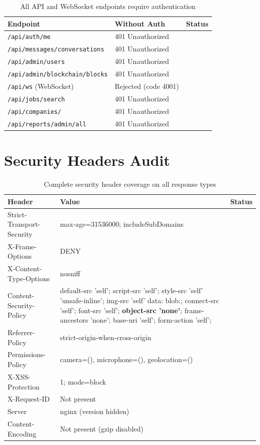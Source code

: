 \documentclass[12pt,a4paper]{article}
\newcommand{\pass}{\textcolor{success}{\checkmark}}
\begin{document}
\begin{table}[H]
\centering
\begin{tabular}{llc}
\toprule
\textbf{Endpoint} & \textbf{Without Auth} & \textbf{Status} \\
\midrule
\texttt{/api/auth/me} & 401 Unauthorized & \pass \\
\texttt{/api/messages/conversations} & 401 Unauthorized & \pass \\
\texttt{/api/admin/users} & 401 Unauthorized & \pass \\
\texttt{/api/admin/blockchain/blocks} & 401 Unauthorized & \pass \\
\texttt{/api/ws} (WebSocket) & Rejected (code 4001) & \pass \\
\texttt{/api/jobs/search} & 401 Unauthorized & \pass \\
\texttt{/api/companies/} & 401 Unauthorized & \pass \\
\texttt{/api/reports/admin/all} & 401 Unauthorized & \pass \\
\bottomrule
\end{tabular}
\caption{All API and WebSocket endpoints require authentication}
\end{table}

\section{Security Headers Audit}

\begin{table}[H]
\centering
\begin{tabularx}{\textwidth}{lXc}
\toprule
\textbf{Header} & \textbf{Value} & \textbf{Status} \\
\midrule
Strict-Transport-Security & max-age=31536000; includeSubDomains & \pass \\
X-Frame-Options & DENY & \pass \\
X-Content-Type-Options & nosniff & \pass \\
Content-Security-Policy & default-src 'self'; script-src 'self'; style-src 'self' 'unsafe-inline'; img-src 'self' data: blob:; connect-src 'self'; font-src 'self'; \textbf{object-src 'none'}; frame-ancestors 'none'; base-uri 'self'; form-action 'self'; & \pass \\
Referrer-Policy & strict-origin-when-cross-origin & \pass \\
Permissions-Policy & camera=(), microphone=(), geolocation=() & \pass \\
X-XSS-Protection & 1; mode=block & \pass \\
X-Request-ID & Not present & \pass \\
Server & nginx (version hidden) & \pass \\
Content-Encoding & Not present (gzip disabled) & \pass \\
\bottomrule
\end{tabularx}
\caption{Complete security header coverage on all response types}
\end{table}
\end{document}
